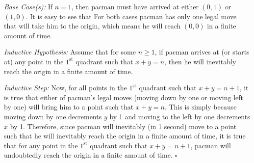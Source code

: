 \begin{enumerate}
        \textit{Base Case(s):} If $n=1$, then pacman must have arrived at either $(0,1)$ or $(1,0)$. It is easy to see that For both cases pacman has only one legal move that will take him to the origin, which means he will reach $(0,0)$ in a finite amount of time.
        
        \textit{Inductive Hypothesis:} Assume that for some $n\geq 1$, if pacman arrives at (or starts at) any point in the $1^{\text{st}}$ quadrant such that $x+y=n$, then he will inevitably reach the origin in a finite amount of time.
        
        \textit{Inductive Step:} Now, for all points in the $1^{\text{st}}$ quadrant such that $x+y=n+1$, it is true that either of pacman's legal moves (moving down by one or moving left by one) will bring him to a point such that $x+y=n$. This is simply because moving down by one decrements $y$ by 1 and moving to the left by one decrements $x$ by 1. Therefore, since pacman will inevitably (in 1 second) move to a point such that he will inevitably reach the origin in a finite amount of time, it is true that for any point in the $1^{\text{st}}$ quadrant such that $x+y=n+1$, pacman will undoubtedly reach the origin in a finite amount of time. $\square$


\end{enumerate}
